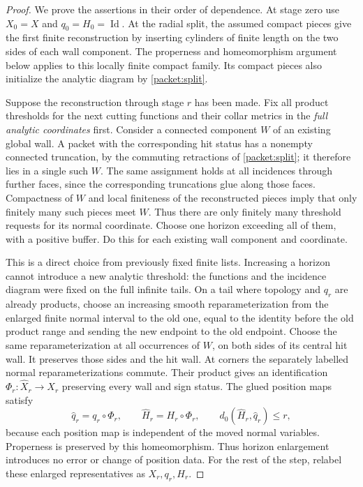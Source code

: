\documentclass[11pt]{article}
\numberwithin{equation}{section}
\theoremstyle{definition}
\theoremstyle{remark}
\begin{document}
\begin{proof}
We prove the assertions in their order of dependence.  At stage zero
use $X_0=X$ and $q_0=H_0=\operatorname{Id}$.  At the radial split, the assumed compact
pieces give the first finite reconstruction by inserting cylinders
of finite length on the two sides of each wall component.  The
properness and homeomorphism argument below applies to this locally
finite compact family.  Its compact pieces also initialize the
analytic diagram by \cref{packet:split}.

Suppose the reconstruction through stage $r$ has been made.  Fix all
product thresholds for the next cutting functions and their collar
metrics in the \emph{full analytic coordinates} first.  Consider a
connected component $W$ of an existing global wall.  A packet with
the corresponding hit status has a nonempty connected truncation,
by the commuting retractions of \cref{packet:split}; it therefore lies
in a single such $W$.  The same assignment holds at all incidences
through further faces, since the corresponding truncations glue along
those faces.  Compactness of $W$ and local finiteness of the reconstructed
pieces imply that only finitely many such pieces meet $W$.  Thus there
are only finitely many threshold requests for its normal coordinate.
Choose one horizon exceeding all of them, with a positive buffer.
Do this for each existing wall component and coordinate.

This is a direct choice from previously fixed finite lists.  Increasing
a horizon cannot introduce a new analytic threshold: the functions
and the incidence diagram were fixed on the full infinite tails.
On a tail where topology and $q_r$ are already products, choose an
increasing smooth reparameterization from the enlarged finite normal
interval to the old one, equal to the identity before the old product
range and sending the new endpoint to the old endpoint.  Choose the
same reparameterization at all occurrences of $W$, on both sides of
its central hit wall.  It preserves those sides and the hit wall.
At corners the separately labelled normal reparameterizations commute.
Their product gives an identification
$\Phi_r:\widehat X_r\to X_r$ preserving every wall and sign status.
The glued position maps satisfy
\[
 \widehat q_r=q_r\circ\Phi_r,
 \qquad \widehat H_r=H_r\circ\Phi_r,
 \qquad
 d_0(\widehat H_r,\widehat q_r)\le r,
\]
because each position map is independent of the moved normal
variables.  Properness is preserved by this homeomorphism.  Thus
horizon enlargement introduces no error or change of position data.
For the rest of the step, relabel these enlarged representatives as
$X_r,q_r,H_r$.


\end{proof}
\end{document}
